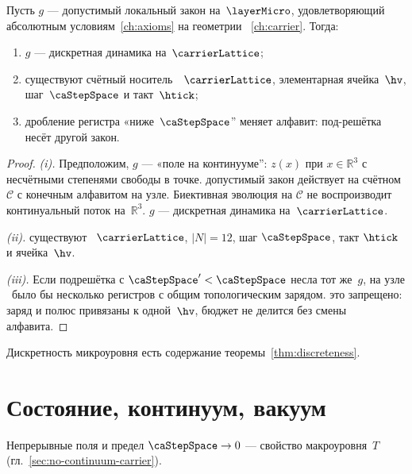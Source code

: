 \begin{theorem}
\label{thm:discreteness}
Пусть $g$ --- допустимый локальный закон на~$\layerMicro$,
удовлетворяющий абсолютным условиям~\cref{ch:axioms} на геометрии \latGCKgen~\cref{ch:carrier}.
Тогда:
\begin{enumerate}[label=(\roman*)]
\item $g$ --- дискретная динамика на~$\carrierLattice$;
\item существуют счётный носитель~\latGCK\ $\carrierLattice$, элементарная ячейка~$\hv$, шаг~$\caStepSpace$ и такт~$\htick$;
\item дробление регистра «ниже~$\caStepSpace$'' меняет алфавит: под-решётка несёт другой закон.
\end{enumerate}
\end{theorem}

\begin{proof}
\emph{(i).}
Предположим, $g$ --- «поле на континууме'': $z(x)$ при $x\in\mathbb{R}^3$ с несчётными степенями свободы в точке.
допустимый закон действует на счётном $\mathcal{C}$ с конечным алфавитом на узле.
Биективная эволюция на $\mathcal{C}$ не воспроизводит континуальный поток на~$\mathbb{R}^3$.
\phence $g$ --- дискретная динамика на~$\carrierLattice$.

\smallskip
\emph{(ii).}
существуют \latGCK\ $\carrierLattice$, $|N|=12$, шаг $\caStepSpace$, такт $\htick$ и ячейка~$\hv$.

\smallskip
\emph{(iii).}
Если подрешётка с $\caStepSpace'<\caStepSpace$ несла тот же~$g$, на узле \latGCKshort\ было бы несколько регистров с общим топологическим зарядом.
это запрещено: заряд и полюс привязаны к одной~$\hv$, бюджет не делится без смены алфавита.
\end{proof}

\begin{corollary}
\label{cor:discreteness}
Дискретность микроуровня есть содержание теоремы~\ref{thm:discreteness}.
\end{corollary}

\section{Состояние, континуум, вакуум}

\begin{corollary}
\label{cor:no-continuum}
Непрерывные поля и предел $\caStepSpace\to 0$ --- свойство макроуровня~$T$
(гл.~\ref{sec:no-continuum-carrier}).
\end{corollary}

